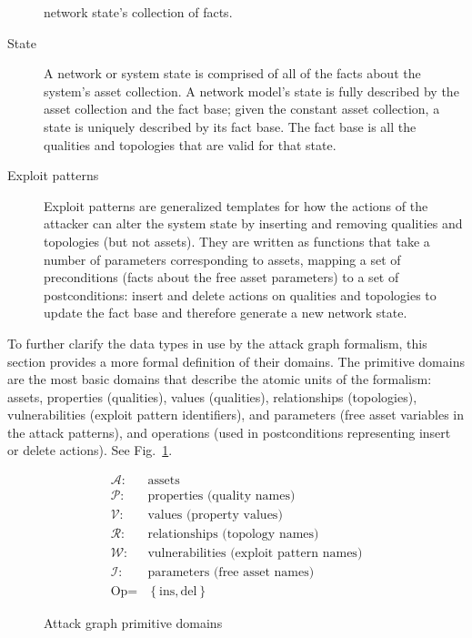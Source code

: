 \begin{description}
		network state's collection of facts.
	\item[State] A network or system state is comprised of all of the facts about the system's asset
		collection. A network model's state is fully described by the asset collection and the fact base;
		given the constant asset collection, a state is uniquely described by its fact base. The fact
		base is all the qualities and topologies that are valid for that state.
	\item[Exploit patterns] Exploit patterns are generalized templates for how the actions of the attacker
		can alter the system state by inserting and removing qualities and topologies (but not assets).
		They are written as functions that take a number of parameters corresponding to assets, mapping
		a set of preconditions (facts about the free asset parameters) to a set of postconditions:
		insert and delete actions on qualities and topologies to update the fact base and therefore
		generate a new network state.
\end{description}
To further clarify the data types in use by the attack graph formalism,
this section provides a more formal definition of their domains.
The primitive domains are the most basic 
domains that describe the atomic units of
the formalism: assets, properties (qualities), values (qualities), relationships (topologies),
vulnerabilities (exploit pattern identifiers), and parameters (free asset variables in the attack
patterns), and operations (used in postconditions representing insert or delete actions).
See Fig.~\ref{fig:primitivedomains}.

\begin{figure}
\begin{align*}
    \mathcal{A} :& \text{assets} \\
    \mathcal{P} :& \text{properties (quality names)} \\
    \mathcal{V} :& \text{values (property values)} \\
    \mathcal{R} :& \text{relationships (topology names)} \\
    \mathcal{W} :& \text{vulnerabilities (exploit pattern names)} \\
    \mathcal{I} :& \text{parameters (free asset names)} \\
    \text{Op} =& \left\{\text{ins}, \text{del} \right\}
\end{align*}
\label{fig:primitivedomains}
\caption{Attack graph primitive domains}
\end{figure}

